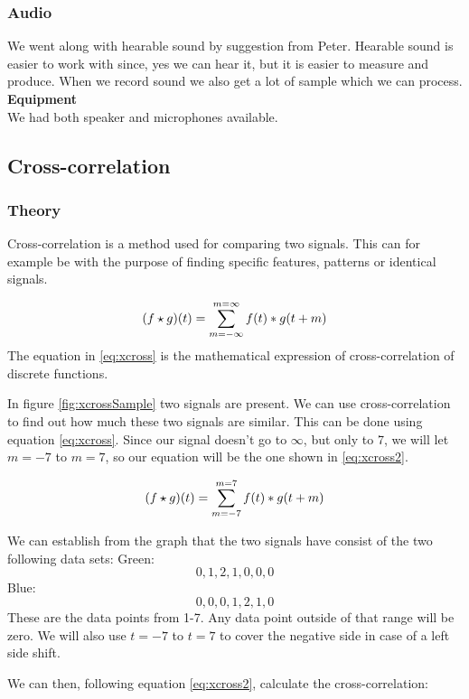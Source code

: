 \subsubsection{Audio}
We went along with hearable sound by suggestion from Peter. Hearable sound is easier to work with since, yes we can hear it, but it is easier to measure and produce. When we record sound we also get a lot of sample which we can process.\\
\textbf{Equipment}\\
We had both speaker and microphones available.
\subsection{Cross-correlation}
\subsubsection{Theory}
Cross-correlation is a method used for comparing two signals. This can for example be with the purpose of finding specific features, patterns or identical signals.


\begin{equation}
\label{eq:xcross}
\centering
(f\star g)(t)=\sum\limits_{m=-\infty}^{m=\infty}f(t)*g(t+m)
\end{equation}
The equation in \ref{eq:xcross} is the mathematical expression of cross-correlation of discrete functions.

In figure \ref{fig:xcrossSample} two signals are present. We can use cross-correlation to find out how much these two signals are similar. This can be done using equation \ref{eq:xcross}. Since our signal doesn't go to $\infty$, but only to 7, we will let $m=-7$ to $m=7$, so our equation will be the one shown in \ref{eq:xcross2}.

\begin{equation}
\label{eq:xcross2}
\centering
(f\star g)(t)=\sum\limits_{m=-7}^{m=7}f(t)*g(t+m)
\end{equation}

We can establish from the graph that the two signals have consist of the two following data sets:
Green: \[0,1,2,1,0,0,0\]
Blue: \[0,0,0,1,2,1,0\]
These are the data points from 1-7. Any data point outside of that range will be zero. We will also use $t=-7$ to $t=7$ to cover the negative side in case of a left side shift.

We can then, following equation \ref{eq:xcross2}, calculate the cross-correlation:

